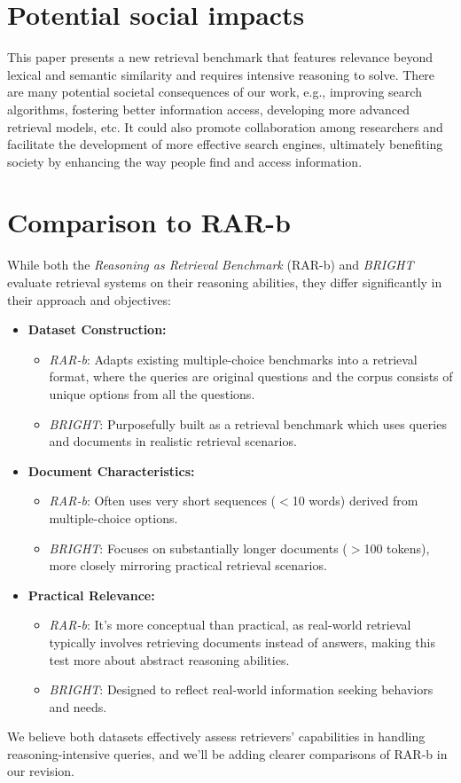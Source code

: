 \section{Potential social impacts}
\label{app:social_impact}
This paper presents a new retrieval benchmark that features relevance beyond lexical and semantic similarity and requires intensive reasoning to solve. 
There are
many potential societal consequences of our work, e.g., improving search algorithms, fostering better information access, developing more advanced retrieval models, etc. 
It could also promote collaboration among researchers and facilitate the development of more effective search engines, ultimately benefiting society by enhancing the way people find and access information.

\section{Comparison to RAR-b}
\label{app:rar-b}
While both the \textit{Reasoning as Retrieval Benchmark} (RAR-b) and \textit{BRIGHT} evaluate retrieval systems on their reasoning abilities, they differ significantly in their approach and objectives:

\begin{itemize}
    \item \textbf{Dataset Construction:}
    \begin{itemize}
        \item \textit{RAR-b}: Adapts existing multiple-choice benchmarks into a retrieval format, where the queries are original questions and the corpus consists of unique options from all the questions.
        \item \textit{BRIGHT}: Purposefully built as a retrieval benchmark which uses queries and documents in realistic retrieval scenarios.
    \end{itemize}
    
    \item \textbf{Document Characteristics:}
    \begin{itemize}
        \item \textit{RAR-b}: Often uses very short sequences ($<$10 words) derived from multiple-choice options.
        \item \textit{BRIGHT}: Focuses on substantially longer documents ($>$100 tokens), more closely mirroring practical retrieval scenarios.
    \end{itemize}
    
    \item \textbf{Practical Relevance:}
    \begin{itemize}
        \item \textit{RAR-b}: It's more conceptual than practical, as real-world retrieval typically involves retrieving documents instead of answers, making this test more about abstract reasoning abilities.
        \item \textit{BRIGHT}: Designed to reflect real-world information seeking behaviors and needs.
    \end{itemize}
\end{itemize}

We believe both datasets effectively assess retrievers' capabilities in handling reasoning-intensive queries, and we'll be adding clearer comparisons of RAR-b in our revision.


% 
